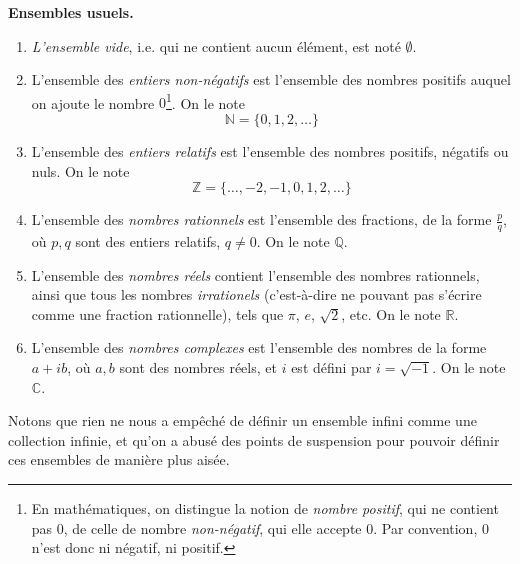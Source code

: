 \begin{greybox}
\textbf{Ensembles usuels.}
\begin{enumerate}
    \item \emph{L'ensemble vide}, i.e. qui ne contient aucun élément, est noté $\emptyset$.
    \item L'ensemble des \emph{entiers non-négatifs} est l'ensemble des nombres positifs auquel on ajoute le nombre $0$\footnote{En mathématiques, on distingue la notion de \emph{nombre positif}, qui ne contient pas $0$, de celle de nombre \emph{non-négatif}, qui elle accepte $0$. Par convention, 0 n'est donc ni négatif, ni positif.}. On le note
    \begin{equation}
    \mathbb{N} = \{0, 1, 2, \ldots\}
    \end{equation}
    
    \item L'ensemble des \emph{entiers relatifs} est l'ensemble des nombres positifs, négatifs ou nuls. On le note
    \begin{equation}
    \mathbb{Z} = \{\ldots, -2, -1, 0, 1, 2, \ldots\}
    \end{equation}
    
    \item L'ensemble des \emph{nombres rationnels} est l'ensemble des fractions, de la forme $\frac{p}{q}$, où $p, q$ sont des entiers relatifs, $q \neq 0$. On le note $\mathbb{Q}$.
    
    \item L'ensemble des \emph{nombres réels} contient l'ensemble des nombres rationnels, ainsi que tous les nombres \emph{irrationels} (c'est-à-dire ne pouvant pas s'écrire comme une fraction rationnelle), tels que $\pi$, $e$, $\sqrt{2}$, etc. On le note $\mathbb{R}$.
    
    \item L'ensemble des \emph{nombres complexes} est l'ensemble des nombres de la forme $a + ib$, où $a, b$ sont des nombres réels, et $i$ est défini par $i = \sqrt{-1}$. On le note $\mathbb{C}$.
\end{enumerate}
\end{greybox}

Notons que rien ne nous a empêché de définir un ensemble infini comme une collection infinie, et qu'on a abusé des points de suspension pour pouvoir définir ces ensembles de manière plus aisée.

